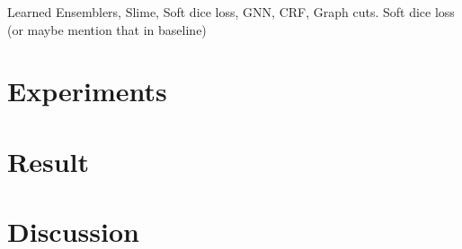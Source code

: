 \documentclass{article}
\begin{document}
    Learned Ensemblers, Slime, Soft dice loss, GNN, CRF, Graph cuts. Soft dice loss (or maybe mention that in baseline)
    
    

\section{Experiments}\label{section:experiments}
\section{Result}\label{section:results}

\section{Discussion}\label{section:model}


\newpage

\small
\printbibliography{}
\end{document}
